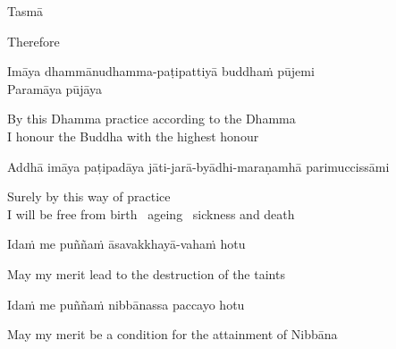 \suttaRef{[DN 16]}

Tasmā

\begin{english}
  Therefore
\end{english}

Imāya dhammānudhamma-paṭipattiyā buddhaṁ pūjemi\\
Paramāya pūjāya

\begin{english}
  By this Dhamma practice according to the Dhamma\\
  I honour the Buddha with the highest honour
\end{english}

Addhā imāya paṭipadāya jāti-jarā-byādhi-maraṇamhā parimuccissāmi

\begin{english}
  Surely by this way of practice\\
  I will be free from birth \breathmark\ ageing \breathmark\ sickness and death
\end{english}

Idaṁ me puññaṁ āsavakkhayā-vahaṁ hotu

\begin{english}
  May my merit lead to the destruction of the taints
\end{english}

Idaṁ me puññaṁ nibbānassa paccayo hotu

\begin{english}
  May my merit be a condition for the attainment of Nibbāna
\end{english}


